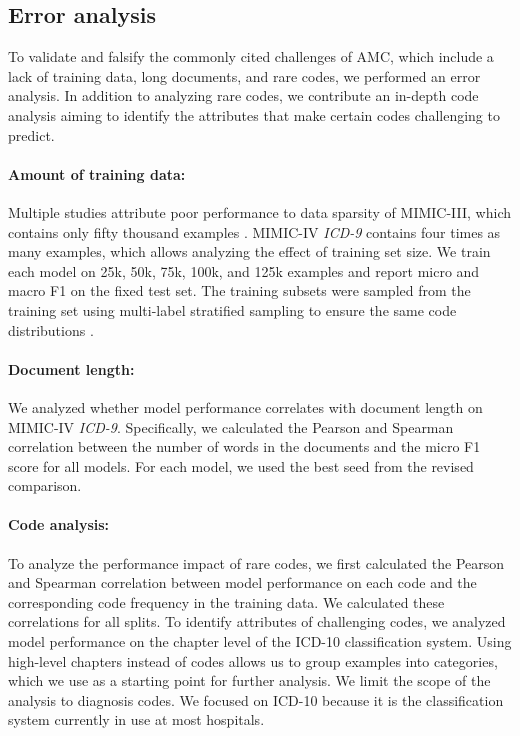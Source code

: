 {\subsection{Error analysis}
To validate and falsify the commonly cited challenges of AMC, which include a lack of training data, long documents, and rare codes, we performed an error analysis. In addition to analyzing rare codes, we contribute an in-depth code analysis aiming to identify the attributes that make certain codes challenging to predict.


\paragraph{Amount of training data:}
Multiple studies attribute poor performance to data sparsity of MIMIC-III, which contains only fifty thousand examples \parencite{kavuluruEmpiricalEvaluationSupervised2015,tengExplainablePredictionMedical2020,yanMedicalCodingClassification2010,yangKnowledgeInjectedPrompt2022}. MIMIC-IV \textit{ICD-9} contains four times as many examples, which allows analyzing the effect of training set size. We train each model on 25k, 50k, 75k, 100k, and 125k examples and report micro and macro F1 on the fixed test set. The training subsets were sampled from the training set using multi-label stratified sampling to ensure the same code distributions \parencite{sechidisStratificationMultilabelData2011}.

\paragraph{Document length:}
We analyzed whether model performance correlates with document length on MIMIC-IV \textit{ICD-9}. Specifically, we calculated the Pearson and Spearman correlation between the number of words in the documents and the micro F1 score for all models. For each model, we used the best seed from the revised comparison.

\paragraph{Code analysis:}
To analyze the performance impact of rare codes, we first calculated the Pearson and Spearman correlation between model performance on each code and the corresponding code frequency in the training data. We calculated these correlations for all splits. To identify attributes of challenging codes, we analyzed model performance on the chapter level of the ICD-10 classification system. Using high-level chapters instead of codes allows us to group examples into categories, which we use as a starting point for further analysis. We limit the scope of the analysis to diagnosis codes. We focused on ICD-10 because it is the classification system currently in use at most hospitals. 


}
